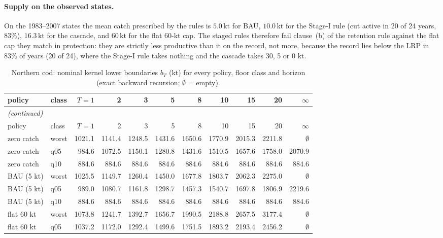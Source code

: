 \documentclass[11pt,a4paper]{article}
\newcommand{\kt}{\,\mathrm{kt}}
\begin{document}
\paragraph{Supply on the observed states.} On the 1983--2007 states the mean catch prescribed by the rules is $5.0\kt$ for BAU, $10.0\kt$ for the Stage-I rule (cut active in 20 of 24 years, $83\%$), $16.3\kt$ for the cascade, and $60\kt$ for the flat 60-kt cap. The staged rules therefore fail clause~(b) of the retention rule against the flat cap they match in protection: they are strictly less productive than it on the record, not more, because the record lies below the LRP in 83\% of years (20 of 24), where the Stage-I rule takes nothing and the cascade takes 30, 5 or 0 kt.
\begingroup\footnotesize\setlength{\tabcolsep}{3pt}
\begin{longtable}{llrrrrrrrrr}
\caption{Northern cod: nominal kernel lower boundaries $b_T$ (kt) for every policy, floor class and horizon (exact backward recursion; $\emptyset$ = empty).}\label{tab:si-cod-kernels}\\
\toprule
policy & class & $T{=}1$ & 2 & 3 & 5 & 8 & 10 & 15 & 20 & $\infty$ \\
\midrule
\endfirsthead
\multicolumn{11}{l}{\emph{(continued)}}\\
\toprule
policy & class & $T{=}1$ & 2 & 3 & 5 & 8 & 10 & 15 & 20 & $\infty$ \\
\midrule
\endhead
\bottomrule
\endfoot
zero catch & worst & 1021.1 & 1141.4 & 1248.5 & 1431.6 & 1650.6 & 1770.9 & 2015.3 & 2211.8 & $\emptyset$ \\
zero catch & q05 & 984.6 & 1072.5 & 1150.1 & 1280.8 & 1431.6 & 1510.5 & 1657.6 & 1758.0 & 2070.9 \\
zero catch & q10 & 884.6 & 884.6 & 884.6 & 884.6 & 884.6 & 884.6 & 884.6 & 884.6 & 884.6 \\
BAU (5 kt) & worst & 1025.5 & 1149.7 & 1260.4 & 1450.0 & 1677.8 & 1803.7 & 2062.3 & 2275.0 & $\emptyset$ \\
BAU (5 kt) & q05 & 989.0 & 1080.7 & 1161.8 & 1298.7 & 1457.3 & 1540.7 & 1697.8 & 1806.9 & 2219.6 \\
BAU (5 kt) & q10 & 884.6 & 884.6 & 884.6 & 884.6 & 884.6 & 884.6 & 884.6 & 884.6 & 884.6 \\
flat 60 kt & worst & 1073.8 & 1241.7 & 1392.7 & 1656.7 & 1990.5 & 2188.8 & 2657.5 & 3177.4 & $\emptyset$ \\
flat 60 kt & q05 & 1037.2 & 1172.0 & 1292.4 & 1499.6 & 1751.5 & 1893.2 & 2193.4 & 2456.2 & $\emptyset$ \\

\end{longtable}
\end{document}
